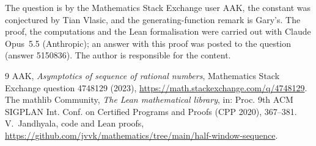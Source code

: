 \documentclass[11pt]{amsart}
\theoremstyle{remark}
\begin{document}
The question is by the Mathematics Stack Exchange user AAK, the constant was conjectured by Tian Vlasic, and the generating-function remark is Gary's. The proof, the computations and the Lean formalisation were carried out with Claude Opus~5.5 (Anthropic); an answer with this proof was posted to the question (answer 5150836). The author is responsible for the content.

\begin{thebibliography}{9}
 AAK, \emph{Asymptotics of sequence of rational numbers}, Mathematics Stack Exchange question 4748129 (2023), \url{https://math.stackexchange.com/q/4748129}.
 The mathlib Community, \emph{The Lean mathematical library}, in: Proc. 9th ACM SIGPLAN Int. Conf. on Certified Programs and Proofs (CPP 2020), 367--381.
 V.~Jandhyala, code and Lean proofs, \url{https://github.com/jvvk/mathematics/tree/main/half-window-sequence}.
\end{thebibliography}
\end{document}
